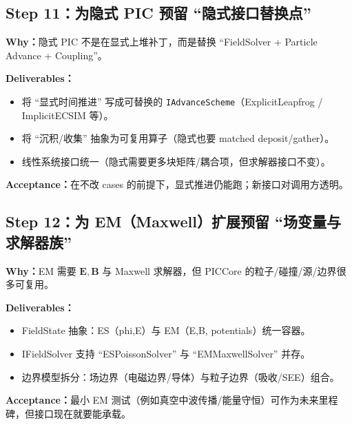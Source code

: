 \documentclass[11pt,a4paper]{ctexart}
\begin{document}
\subsection*{Step 11：为隐式 PIC 预留 ``隐式接口替换点''}
\textbf{Why：}隐式 PIC 不是在显式上堆补丁，而是替换 ``FieldSolver + Particle Advance + Coupling''。

\textbf{Deliverables：}
\begin{itemize}[leftmargin=2em]
\item 将 ``显式时间推进'' 写成可替换的 \texttt{IAdvanceScheme}（ExplicitLeapfrog / ImplicitECSIM 等）。
\item 将 ``沉积/收集'' 抽象为可复用算子（隐式也要 matched deposit/gather）。
\item 线性系统接口统一（隐式需要更多块矩阵/耦合项，但求解器接口不变）。
\end{itemize}
\textbf{Acceptance：}在不改 cases 的前提下，显式推进仍能跑；新接口对调用方透明。

\subsection*{Step 12：为 EM（Maxwell）扩展预留 ``场变量与求解器族''}
\textbf{Why：}EM 需要 $\mathbf{E},\mathbf{B}$ 与 Maxwell 求解器，但 PICCore 的粒子/碰撞/源/边界很多可复用。

\textbf{Deliverables：}
\begin{itemize}[leftmargin=2em]
\item FieldState 抽象：ES（phi,E）与 EM（E,B, potentials）统一容器。
\item IFieldSolver 支持 ``ESPoissonSolver'' 与 ``EMMaxwellSolver'' 并存。
\item 边界模型拆分：场边界（电磁边界/导体）与粒子边界（吸收/SEE）组合。
\end{itemize}
\textbf{Acceptance：}最小 EM 测试（例如真空中波传播/能量守恒）可作为未来里程碑，但接口现在就要能承载。
\end{document}
